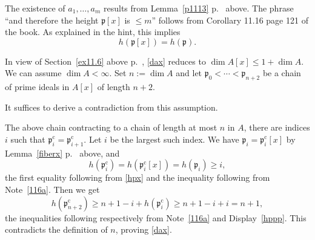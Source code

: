\documentclass[12pt,letterpaper]{article}%
\newcommand{\oo}{\operatorname}\newcommand{\ooo}{\operatorname*}
\newcommand{\mf}{\mathfrak}
\newcommand{\ppp}{\mf p}
\begin{document}
The existence of $a_1,\ldots,a_m$ results from Lemma~\ref{p1113} p.~\pageref{p1113} above. The phrase ``and therefore the height $\ppp[x]$ is $\le m$'' follows from Corollary 11.16 page 121 of the book. As explained in the hint, this implies  
\begin{equation}\label{hpx}
h(\ppp[x])=h(\ppp).
\end{equation} 

In view of Section~\ref{ex11.6} above p.~\pageref{ex11.6}, \eqref{dax} reduces to $
\dim A[x]\le1+\dim A$. We can assume $\dim A<\infty$. Set $n:=\dim A$ and let $ \ppp_0<\cdots<\ppp_{n+2}$ be a chain of prime ideals in $A[x]$ of length $n+2$. 

It suffices to derive a contradiction from this assumption. 

The above chain contracting to a chain of length at most $n$ in $A$, there are indices $i$ such that $\ppp_i^{\oo c}=\ppp_{i+1}^{\oo c}$. Let $i$ be the largest such index. We have $\ppp_i=\ppp_i^{\oo c}[x]$ by Lemma~\ref{fiberx} p.~\pageref{fiberx} above, and 
\begin{equation}\label{hppp}
h(\ppp_i^{\oo c})=h(\ppp_i^{\oo c}[x])=h(\ppp_i)\ge i,
\end{equation} 
the first equality following from \eqref{hpx} and the inequality following from Note~\ref{116a}. Then we get 
$$
h(\ppp_{n+2}^{\oo c})\ge n+1-i+h(\ppp_i^{\oo c})\ge n+1-i+i=n+1,
$$ 
the inequalities following respectively from Note~\ref{116a} and Display~\eqref{hppp}. This contradicts the definition of $n$, proving \eqref{dax}.%
\end{document}
